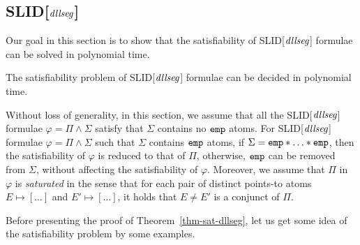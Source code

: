 \documentclass{llncs}
\begin{document}
\subsection{SLID[$\mathit{dllseg}$]}

Our goal in this section is to show that the satisfiability of SLID[$\mathit{dllseg}$] formulae can be solved in polynomial time.

\begin{theorem}\label{thm-sat-dllseg}
The satisfiability problem of SLID[$\mathit{dllseg}$] formulae can be decided in polynomial time.
\end{theorem}



Without loss of generality, in this section, we assume that all the SLID[$\mathit{dllseg}$] formulae $\varphi = \Pi \wedge \Sigma$ satisfy that $\Sigma$ contains no $\mathtt{emp}$ atoms. For SLID[$\mathit{dllseg}$] formulae $\varphi = \Pi \wedge \Sigma$ such that $\Sigma$ contains $\mathtt{emp}$ atoms, if $\Sigma = \slemp \sep \dots \sep \slemp$, then the satisfiability of $\varphi$ is reduced to that of $\Pi$, otherwise, $\mathtt{emp}$ can be removed from $\Sigma$, without affecting the satisfiability of $\varphi$. Moreover, we assume that $\Pi$ in $\varphi$ is \emph{saturated} in the sense that for each pair of distinct points-to atoms $E \mapsto [\dots]$ and $E' \mapsto [\dots]$, it holds that $E \neq E'$ is a conjunct of $\Pi$.

Before presenting the proof of Theorem~\ref{thm-sat-dllseg}, let us get some idea of the satisfiability problem by some examples.
\end{document}
